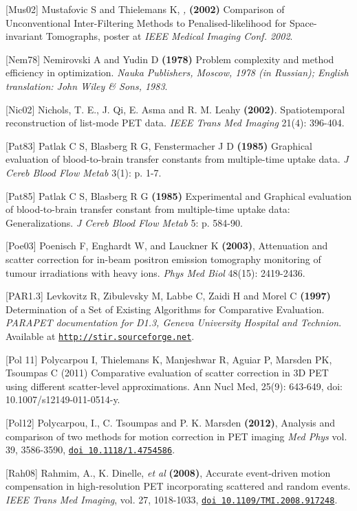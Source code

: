 \documentclass{article}
\def\url#1#2{\mbox{\href{#1}{\tt #2}}}
\begin{document}
{{{{{{{[}Mus02] Mustafovic S and Thielemans K, \textit{,} \textbf{(2002)}  Comparison 
of Unconventional Inter-Filtering Methods to Penalised-likelihood 
for Space-invariant Tomographs, poster at \textit{IEEE Medical Imaging 
Conf. 2002}.

{[}Nem78] Nemirovski A and Yudin D \textbf{(1978)} Problem complexity 
and method efficiency in optimization. \textit{Nauka Publishers, 
Moscow, 1978 (in Russian); English translation: John Wiley \& 
Sons, 1983}.

{[}Nic02] Nichols, T. E., J. Qi, E. Asma and R. M. Leahy \textbf{(2002)}. Spatiotemporal reconstruction of list-mode PET data.  \textit{IEEE Trans Med Imaging} 21(4): 396-404.

{[}Pat83] Patlak C S, Blasberg R G, Fenstermacher J D \textbf{(1985)}  Graphical evaluation of blood-to-brain 
transfer constants from multiple-time uptake data. \textit{J Cereb Blood Flow Metab} 3(1): p. 1-7.

{[}Pat85] Patlak C S, Blasberg R G \textbf{(1985)}  Experimental and Graphical evaluation of blood-to-brain 
transfer constant from multiple-time uptake data: Generalizations. \textit{J Cereb Blood Flow Metab} 5: p. 584-90.

{[}Poe03{]} Poenisch F, Enghardt W, and Lauckner K \textbf{(2003)}, 
Attenuation and scatter correction for in-beam positron emission tomography 
monitoring of tumour irradiations with heavy ions. \textit { Phys Med Biol } 48(15): 2419-2436. 

 {[}PAR1.3] Levkovitz R, Zibulevsky M, Labbe C, Zaidi H and Morel 
C \textbf{(1997)} Determination of a Set of Existing Algorithms for 
Comparative Evaluation. \textit{PARAPET documentation for D1.3, Geneva 
University Hospital and Technion}. \\
Available at \url{http://stir.sourceforge.net }{http://stir.sourceforge.net}. 

[Pol 11] Polycarpou I, Thielemans K, Manjeshwar R, Aguiar P, Marsden PK,
Tsoumpas C (2011) Comparative evaluation of scatter correction in 3D PET
using different scatter-level approximations. Ann Nucl Med, 25(9):
643-649, doi: 10.1007/s12149-011-0514-y.

[Pol12] Polycarpou, I., C.
Tsoumpas and P. K. Marsden \textbf{(2012)}, Analysis and
comparison of two methods for motion correction in PET imaging
\textit{Med Phys} vol. 39, 3586-3590, 
\url{http://dx.doi.org/10.1118/1.4754586}{doi 10.1118/1.4754586}.


[Rah08] Rahmim, A., K.
Dinelle, \textit{et al} \textbf{(2008)}, Accurate event-driven motion compensation
in high-resolution PET incorporating scattered and random events. \textit{IEEE Trans
Med Imaging}, vol. 27, 1018-1033, 
\url{http://dx.doi.org/10.1109/TMI.2008.917248}{doi 10.1109/TMI.2008.917248}.

}}}}}}
\end{document}
